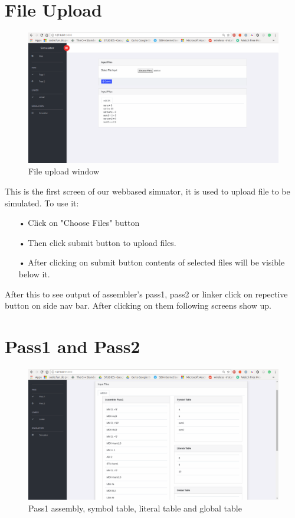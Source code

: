 \documentclass{scrreprt}
\begin{document}
\section{File Upload}
\begin{figure}[H]
\centering
\includegraphics[width=\textwidth, keepaspectratio]{fileUpload.png}
\caption{File upload window}
\end{figure}
This is the first screen of our webbased simuator, it is used to upload file to be simulated. To use it:
\begin{itemize}
\item[•] Click on "Choose Files" button
\item[•] Then click submit button to upload files.
\item[•] After clicking on submit button contents of selected files will be visible below it.
\end{itemize}

After this to see output of assembler's pass1, pass2 or linker click on repective button on side nav bar.
After clicking on them following screens show up.

\section{Pass1 and Pass2}
\begin{figure}[H]
\centering
\includegraphics[width=\textwidth, keepaspectratio]{pass1.png}
\caption{Pass1 assembly, symbol table, literal table and global table}
\end{figure}
\end{document}
